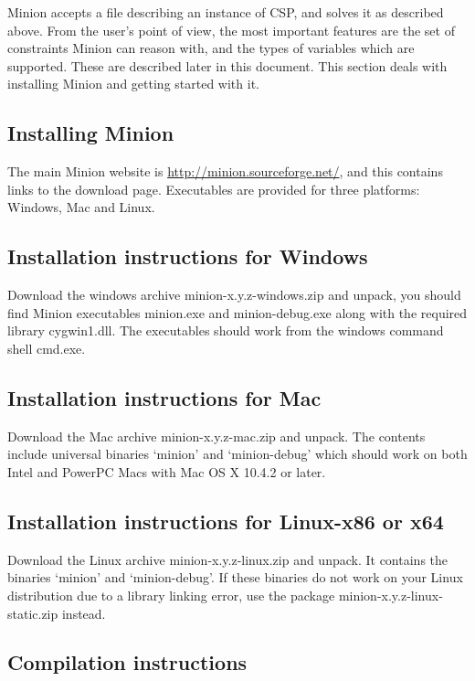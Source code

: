 \documentclass[oneside]{book}
\begin{document}
Minion accepts a file describing an instance of CSP, and solves it
as described above. From the user's point of view, the most important
features are the set of constraints Minion can reason with, and the
types of variables which are supported. These are described later
in this document. This section deals with installing Minion and getting
started with it.


\subsection{Installing Minion}

The main Minion website is \url{http://minion.sourceforge.net/},
and this contains links to the download page. Executables are provided
for three platforms: Windows, Mac and Linux.


\subsection{Installation instructions for Windows}

Download the windows archive minion-x.y.z-windows.zip and unpack,
you should find Minion executables minion.exe and minion-debug.exe
along with the required library cygwin1.dll. The executables should
work from the windows command shell cmd.exe.


\subsection{Installation instructions for Mac}

Download the Mac archive minion-x.y.z-mac.zip and unpack. The contents
include universal binaries `minion' and `minion-debug' which should
work on both Intel and PowerPC Macs with Mac OS X 10.4.2 or later.


\subsection{Installation instructions for Linux-x86 or x64}

Download the Linux archive minion-x.y.z-linux.zip and unpack. It contains
the binaries `minion' and `minion-debug'. If these binaries do not
work on your Linux distribution due to a library linking error, use
the package minion-x.y.z-linux-static.zip instead.


\subsection{Compilation instructions}
\end{document}
